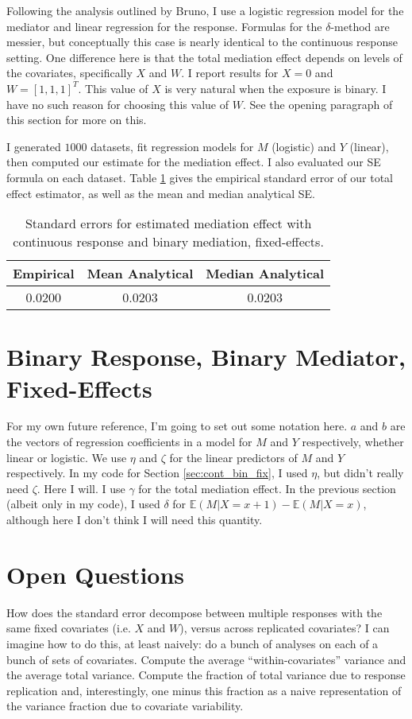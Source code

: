 \documentclass{article}
\newcommand{\bE}{\mathbb{E}}
\begin{document}
Following the analysis outlined by Bruno, I use a logistic regression model for the mediator and linear regression for the response. Formulas for the $\delta$-method are messier, but conceptually this case is nearly identical to the continuous response setting. One difference here is that the total mediation effect depends on levels of the covariates, specifically $X$ and $W$. I report results for $X=0$ and $W = [1,1,1]^T$. This value of $X$ is very natural when the exposure is binary. I have no such reason for choosing this value of $W$. See the opening paragraph of this section for more on this.

I generated $1000$ datasets, fit regression models for $M$ (logistic) and $Y$ (linear), then computed our estimate for the mediation effect. I also evaluated our SE formula on each dataset. Table \ref{tab:SEs_cont_bin_fix} gives the empirical standard error of our total effect estimator, as well as the mean and median analytical SE.

\begin{table}
    \centering
    \begin{tabular}{|c|c|c|}
        \hline
        Empirical & Mean Analytical & Median Analytical\\
        \hline
        0.0200 & 0.0203 & 0.0203\\
        \hline
    \end{tabular}
    \caption{Standard errors for estimated mediation effect with continuous response and binary mediation, fixed-effects.}
    \label{tab:SEs_cont_bin_fix}
\end{table}


\section{Binary Response, Binary Mediator, Fixed-Effects}

For my own future reference, I'm going to set out some notation here. $a$ and $b$ are the vectors of regression coefficients in a model for $M$ and $Y$ respectively, whether linear or logistic. We use $\eta$ and $\zeta$ for the linear predictors of $M$ and $Y$ respectively. In my code for Section \ref{sec:cont_bin_fix}, I used $\eta$, but didn't really need $\zeta$. Here I will. I use $\gamma$ for the total mediation effect. In the previous section (albeit only in my code), I used $\delta$ for $\bE(M | X=x+1) - \bE(M | X=x)$, although here I don't think I will need this quantity.




\section{Open Questions}

How does the standard error decompose between multiple responses with the same fixed covariates (i.e. $X$ and $W$), versus across replicated covariates? I can imagine how to do this, at least naively: do a bunch of analyses on each of a bunch of sets of covariates. Compute the average ``within-covariates'' variance and the average total variance. Compute the fraction of total variance due to response replication and, interestingly, one minus this fraction as a naive representation of the variance fraction due to covariate variability.
\end{document}
